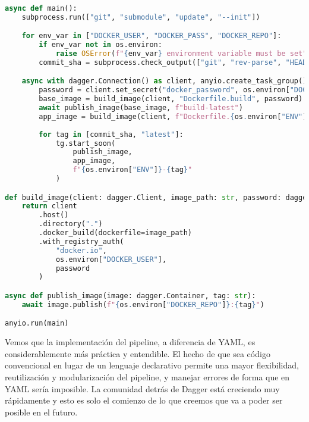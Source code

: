 \begin{lstlisting}[language=Python, caption={\textbf{Pipeline de construcción y publicación de las imágenes de Docker}}]
    
async def main():
    subprocess.run(["git", "submodule", "update", "--init"])

    for env_var in ["DOCKER_USER", "DOCKER_PASS", "DOCKER_REPO"]:
        if env_var not in os.environ:
            raise OSError(f"{env_var} environment variable must be set")
        commit_sha = subprocess.check_output(["git", "rev-parse", "HEAD"]).strip().decode("utf-8")[:7]

    async with dagger.Connection() as client, anyio.create_task_group() as tg:
        password = client.set_secret("docker_password", os.environ["DOCKER_PASS"])
        base_image = build_image(client, "Dockerfile.build", password)
        await publish_image(base_image, f"build-latest")
        app_image = build_image(client, f"Dockerfile.{os.environ["ENV"]}", password)
        
        for tag in [commit_sha, "latest"]:
            tg.start_soon(
                publish_image,
                app_image,
                f"{os.environ["ENV"]}-{tag}"
            )

def build_image(client: dagger.Client, image_path: str, password: dagger.Secret):
    return client
        .host()
        .directory(".")
        .docker_build(dockerfile=image_path)
        .with_registry_auth(
            "docker.io",
            os.environ["DOCKER_USER"],
            password
        )

async def publish_image(image: dagger.Container, tag: str):
    await image.publish(f"{os.environ["DOCKER_REPO"]}:{tag}")

anyio.run(main)

\end{lstlisting}

Vemos que la implementación del pipeline, a diferencia de YAML, es considerablemente más práctica y entendible. El hecho de que sea código convencional
en lugar de un lenguaje declarativo permite una mayor flexibilidad, reutilización y modularización del pipeline, y manejar errores de forma que en YAML
sería imposible. La comunidad detrás de Dagger está creciendo muy rápidamente y esto es solo el comienzo de lo que creemos que va a poder ser posible en el futuro.
